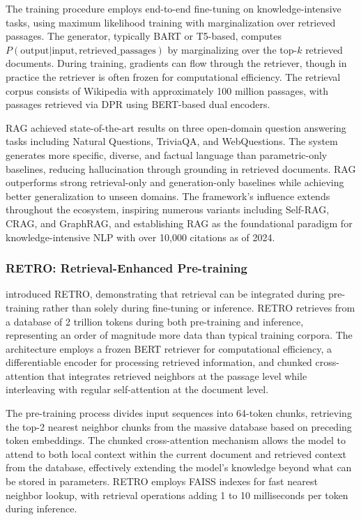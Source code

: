 The training procedure employs end-to-end fine-tuning on knowledge-intensive tasks, using maximum likelihood training with marginalization over retrieved passages. The generator, typically BART or T5-based, computes $P(\text{output} | \text{input}, \text{retrieved\_passages})$ by marginalizing over the top-$k$ retrieved documents. During training, gradients can flow through the retriever, though in practice the retriever is often frozen for computational efficiency. The retrieval corpus consists of Wikipedia with approximately 100 million passages, with passages retrieved via DPR using BERT-based dual encoders.

RAG achieved state-of-the-art results on three open-domain question answering tasks including Natural Questions, TriviaQA, and WebQuestions. The system generates more specific, diverse, and factual language than parametric-only baselines, reducing hallucination through grounding in retrieved documents. RAG outperforms strong retrieval-only and generation-only baselines while achieving better generalization to unseen domains. The framework's influence extends throughout the ecosystem, inspiring numerous variants including Self-RAG, CRAG, and GraphRAG, and establishing RAG as the foundational paradigm for knowledge-intensive NLP with over 10,000 citations as of 2024.

\subsubsection{RETRO: Retrieval-Enhanced Pre-training}

\citet{borgeaud2022improving} introduced RETRO, demonstrating that retrieval can be integrated during pre-training rather than solely during fine-tuning or inference. RETRO retrieves from a database of 2 trillion tokens during both pre-training and inference, representing an order of magnitude more data than typical training corpora. The architecture employs a frozen BERT retriever for computational efficiency, a differentiable encoder for processing retrieved information, and chunked cross-attention that integrates retrieved neighbors at the passage level while interleaving with regular self-attention at the document level.

The pre-training process divides input sequences into 64-token chunks, retrieving the top-2 nearest neighbor chunks from the massive database based on preceding token embeddings. The chunked cross-attention mechanism allows the model to attend to both local context within the current document and retrieved context from the database, effectively extending the model's knowledge beyond what can be stored in parameters. RETRO employs FAISS indexes for fast nearest neighbor lookup, with retrieval operations adding 1 to 10 milliseconds per token during inference.

